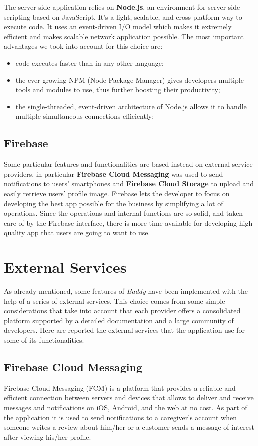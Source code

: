 \documentclass[../../dd.tex]{subfiles}
\begin{document}
    The server side application relies on \textbf{Node.js}, an environment for server-side scripting based on JavaScript.  It’s a light, scalable, and cross-platform way to execute code. It uses an event-driven I/O model which makes it extremely efficient and makes scalable network application possible. The most important advantages we took into account for this choice are:

    \begin{itemize}
        \item code executes faster than in any other language;
        \item the ever-growing NPM (Node Package Manager) gives developers multiple tools and modules to use, thus further boosting their productivity;
        \item the single-threaded, event-driven architecture of Node.js allows it to handle multiple simultaneous connections efficiently;
    \end{itemize}

    \subsection{Firebase}
    Some particular features and functionalities are based instead on external service providers, in particular \textbf{Firebase Cloud Messaging} was used to send notifications to users' smartphones and \textbf{Firebase Cloud Storage} to upload and easily retrieve users' profile image. Firebase lets the developer to focus on developing the best app possible for the business by simplifying a lot of operations. Since the operations and internal functions are so solid, and taken care of by the Firebase interface, there is more time available for developing high quality app that users are going to want to use.


    \section{External Services}
    As already mentioned, some features of \textit{Baddy} have been implemented with the help of a series of external services. This choice comes from some simple considerations that take into account that each provider offers a consolidated platform supported by a detailed documentation and a large community of developers.
    Here are reported the external services that the application use for some of its functionalities.

    \subsection{Firebase Cloud Messaging}
    Firebase Cloud Messaging (FCM) is a platform that provides a reliable and efficient connection between servers and devices that allows to deliver and receive messages and notifications on iOS, Android, and the web at no cost. As part of the application it is used to send notifications to a caregiver's account when someone writes a review about him/her or a customer sends a message of interest after viewing his/her profile.
\end{document}
